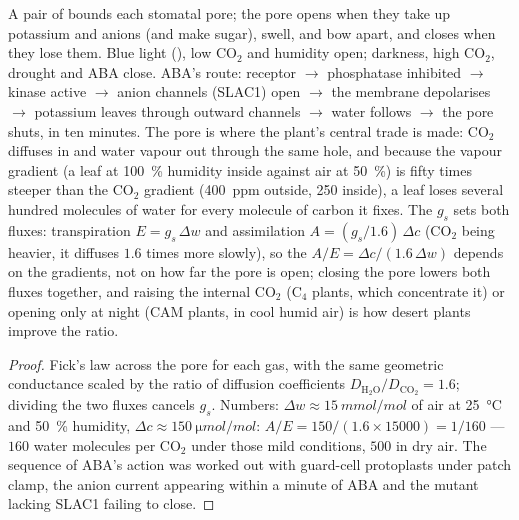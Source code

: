 \begin{proposition}\label{prop:b3:plant-molecular-physiology:stomata}
A pair of \emph{} bounds each stomatal pore; the pore opens
when they take up potassium and anions (and make sugar), swell, and
bow apart, and closes when they lose them. Blue light (),
low CO$_{2}$ and humidity open; darkness, high CO$_{2}$, drought and
ABA close. ABA's route: receptor $\to$ phosphatase inhibited $\to$
kinase active $\to$ anion channels (SLAC1) open $\to$ the membrane
depolarises $\to$ potassium leaves through outward channels $\to$ water
follows $\to$ the pore shuts, in ten minutes. The pore is where the
plant's central trade is made: CO$_{2}$ diffuses in and water vapour
out through the same hole, and because the vapour gradient (a leaf at
\qty{100}{\%} humidity inside against air at \qty{50}{\%}) is fifty
times steeper than the CO$_{2}$ gradient (\qty{400}{ppm} outside,
\qty{250}{} inside), a leaf loses several hundred molecules of water
for every molecule of carbon it fixes. The \emph{}
$g_{s}$ sets both fluxes: transpiration $E = g_{s}\,\Delta w$ and
assimilation $A = (g_{s}/1.6)\,\Delta c$ (CO$_{2}$ being heavier, it
diffuses $1.6$ times more slowly), so the \emph{}
$A/E = \Delta c/(1.6\,\Delta w)$ depends on the gradients, not on how
far the pore is open; closing the pore lowers both fluxes together, and
raising the internal CO$_{2}$ (C$_{4}$ plants, which concentrate it) or
opening only at night (CAM plants, in cool humid air) is how desert
plants improve the ratio.
\end{proposition}
\begin{proof}
Fick's law across the pore for each gas, with the same geometric
conductance scaled by the ratio of diffusion coefficients
$D_{\mathrm{H_2O}}/D_{\mathrm{CO_2}} = 1.6$; dividing the two fluxes
cancels $g_{s}$. Numbers: $\Delta w \approx \qty{15}{mmol/mol}$ of air
at \qty{25}{\celsius} and \qty{50}{\%} humidity, $\Delta c \approx
\qty{150}{\micro mol/mol}$: $A/E = 150/(1.6\times\num{15000}) = 1/160$
--- $160$ water molecules per CO$_{2}$ under those mild conditions,
$500$ in dry air. The sequence of ABA's action was worked out with
guard-cell protoplasts under patch clamp, the anion current appearing
within a minute of ABA and the mutant lacking SLAC1 failing to close.
\end{proof}

